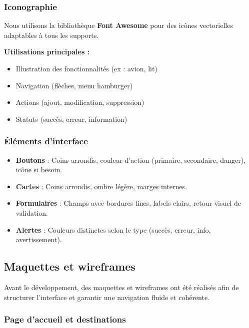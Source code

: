 \documentclass[a4paper,12pt]{article}
\begin{document}
\subsubsection{Iconographie}
Nous utilisons la bibliothèque \textbf{Font Awesome} pour des icônes vectorielles adaptables à tous les supports.

\textbf{Utilisations principales :}
\begin{itemize}
  \item Illustration des fonctionnalités (ex : avion, lit)
  \item Navigation (flèches, menu hamburger)
  \item Actions (ajout, modification, suppression)
  \item Statuts (succès, erreur, information)
\end{itemize}

\subsubsection{Éléments d’interface}
\begin{itemize}
  \item \textbf{Boutons} : Coins arrondis, couleur d’action (primaire, secondaire, danger), icône si besoin.
  \item \textbf{Cartes} : Coins arrondis, ombre légère, marges internes.
  \item \textbf{Formulaires} : Champs avec bordures fines, labels clairs, retour visuel de validation.
  \item \textbf{Alertes} : Couleurs distinctes selon le type (succès, erreur, info, avertissement).
\end{itemize}
\subsection{Maquettes et wireframes}

Avant le développement, des maquettes et wireframes ont été réalisés afin de structurer l’interface et garantir une navigation fluide et cohérente.

\subsubsection{Page d'accueil et destinations}
\end{document}
